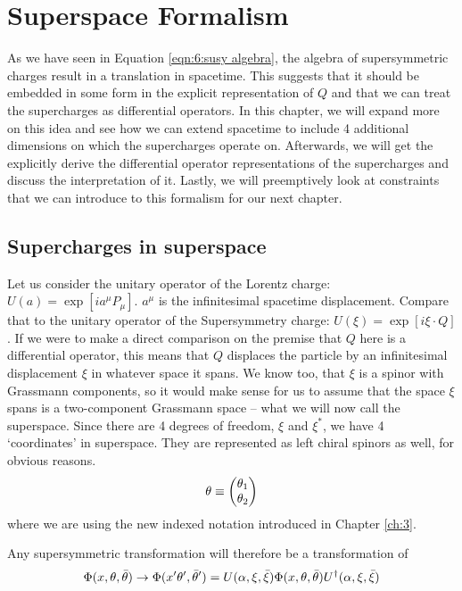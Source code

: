\chapter{Superspace Formalism}
\label{ch:11}

As we have seen in Equation \ref{eqn:6:susy algebra}, the algebra of supersymmetric charges result in a translation in spacetime. This suggests that it should be embedded in some form in the explicit representation of $Q$ and that we can treat the supercharges as differential operators. In this chapter, we will expand more on this idea and see how we can extend spacetime to include 4 additional dimensions on which the supercharges operate on. Afterwards, we will get the explicitly derive the differential operator representations of the supercharges and discuss the interpretation of it. Lastly, we will preemptively look at constraints that we can introduce to this formalism for our next chapter.

\section{Supercharges in superspace}
Let us consider the unitary operator of the Lorentz charge: $U(a) = \exp[ia^\mu P_\mu]$. $a^\mu$ is the infinitesimal spacetime displacement. Compare that to the unitary operator of the Supersymmetry charge: $U(\xi) =  \exp[i\xi \cdot Q]$. If we were to make a direct comparison on the premise that $Q$ here is a differential operator, this means that $Q$ displaces the particle by an infinitesimal displacement $\xi$ in whatever space it spans. We know too, that $\xi$ is a spinor with Grassmann components, so it would make sense for us to assume that the space $\xi$ spans is a two-component Grassmann space -- what we will now call the superspace. Since there are 4 degrees of freedom, $\xi$ and $\xi^*$, we have 4 `coordinates' in superspace. They are represented as left chiral spinors as well, for obvious reasons.
\begin{equation}
    \theta \equiv \begin{pmatrix}{\theta_1}\\{\theta_2}\end{pmatrix}
\end{equation}
where we are using the new indexed notation introduced in Chapter \ref{ch:3}.

Any supersymmetric transformation will therefore be a transformation of
\begin{equation}
    \Phi(x, \theta, \Bar{\theta}) \rightarrow \Phi(x^\prime \theta^\prime, \Bar{\theta}^\prime) = U(\alpha, \xi, \Bar{\xi}) \Phi(x, \theta, \Bar{\theta}) U^\dagger(\alpha, \xi, \Bar{\xi})
    \label{eqn:11:susy transformation with unitary operators}
\end{equation}

